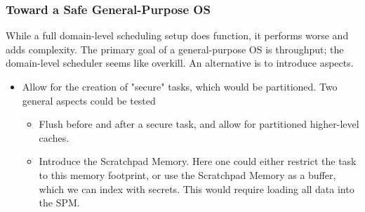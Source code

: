 \begin{frame}
	\frametitle{Toward a Safe General-Purpose OS}

	While a full domain-level scheduling setup does function, it performs worse and
	adds complexity. The primary goal of a general-purpose OS is throughput; the domain-level
	scheduler seems like overkill. An alternative is to introduce aspects.

  \vspace{0.2cm}

	\begin{itemize}
		\item Allow for the creation of "secure" tasks, which would be partitioned. Two general aspects could be tested
		      \begin{itemize}
         \item Flush before and after a secure task, and allow for partitioned
                   higher-level caches.
			      \item Introduce the Scratchpad Memory. Here one could either restrict the
			            task to this memory footprint, or use the Scratchpad Memory as a buffer,
			            which we can index with secrets. This would require loading all data into
			            the SPM.
		      \end{itemize}
	\end{itemize}
\end{frame}
